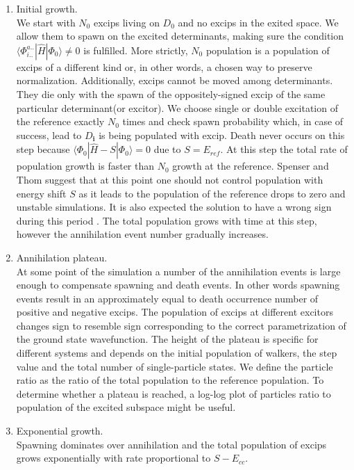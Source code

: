 \documentclass[twoside,english]{uiofysmaster}
\begin{document}
\begin{enumerate}
	\item Initial growth.\\ 
	We start with $N_0$ excips living on $D_0$ and no excips in the exited space. We allow them to spawn on the excited determinants, making sure the condition $\langle \Phi_{i..}^{a..}|\hat{H}|\Phi_0\rangle \neq 0$ is fulfilled. More strictly, $N_0$ population is a population of excips of a different kind or, in other words, a chosen way to preserve normalization. Additionally, excips cannot be moved among determinants. They die only with the spawn of the oppositely-signed excip of the same particular determinant(or excitor). We choose single or double excitation of the reference exactly $N_0$ times and check spawn probability which, in case of success, lead to $D_{\boldsymbol{i}}$ is being populated with excip. 
	Death never occurs on this step because $\langle \Phi_0|\hat{H} -S|\Phi_0\rangle = 0$ due to $S=E_{ref}$.
	At this step the total rate of population growth is faster than $N_0$ growth at the reference.
	Spenser and Thom\cite{SpencerDevelopmentsstochasticcoupled2016} suggest that at this point one should not control population with energy shift $S$ as it leads to the population of the reference drops to zero and unstable simulations. It is also expected the solution to have a wrong sign during this period \cite{Spencersignproblempopulation2012} \cite{SpencerDevelopmentsstochasticcoupled2016}.
	The total population grows with time at this step, however the annihilation event number gradually increases.
	\item Annihilation plateau.\\
	At some point of the simulation a number of the annihilation events is large enough to compensate spawning and death events. In other words spawning events result in an approximately equal to death occurrence number of positive and negative excips. The population of excips at different excitors changes sign to resemble sign corresponding to the correct parametrization of the ground state wavefunction. 
	The height of the plateau is specific for different systems and depends on the initial population of walkers, the step value and the total number of single-particle states. We define the particle ratio as the ratio of the total population to the reference population. To determine whether a plateau is reached, a log-log plot of particles ratio to population of the excited subspace might be useful.
	\item Exponential growth.\\
	Spawning dominates over annihilation and the total population of excips grows exponentially with rate proportional to $S - E_{cc}$.
\end{enumerate}
\end{document}

